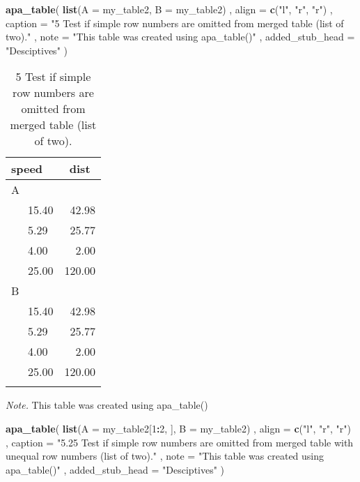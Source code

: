 \documentclass[man]{apa6}
\newenvironment{Shaded}{\begin{snugshade}}{\end{snugshade}}
\newcommand{\KeywordTok}[1]{\textcolor[rgb]{0.13,0.29,0.53}{\textbf{#1}}}
\newcommand{\DataTypeTok}[1]{\textcolor[rgb]{0.13,0.29,0.53}{#1}}
\newcommand{\DecValTok}[1]{\textcolor[rgb]{0.00,0.00,0.81}{#1}}
\newcommand{\StringTok}[1]{\textcolor[rgb]{0.31,0.60,0.02}{#1}}
\newcommand{\OperatorTok}[1]{\textcolor[rgb]{0.81,0.36,0.00}{\textbf{#1}}}
\newcommand{\NormalTok}[1]{#1}
\begin{document}
\begin{Shaded}
\begin{Highlighting}[]
\KeywordTok{apa_table}\NormalTok{(}
  \KeywordTok{list}\NormalTok{(}\DataTypeTok{A =}\NormalTok{ my_table2, }\DataTypeTok{B =}\NormalTok{ my_table2)}
\NormalTok{  , }\DataTypeTok{align =} \KeywordTok{c}\NormalTok{(}\StringTok{"l"}\NormalTok{, }\StringTok{"r"}\NormalTok{, }\StringTok{"r"}\NormalTok{)}
\NormalTok{  , }\DataTypeTok{caption =} \StringTok{"5 Test if simple row numbers are omitted from merged table (list of two)."}
\NormalTok{  , }\DataTypeTok{note =} \StringTok{"This table was created using apa_table()"}
\NormalTok{  , }\DataTypeTok{added_stub_head =} \StringTok{"Desciptives"}
\NormalTok{)}
\end{Highlighting}
\end{Shaded}

\begin{table}[tbp]
\begin{center}
\begin{threeparttable}
\caption{\label{tab:unnamed-chunk-5}5 Test if simple row numbers are omitted from merged table (list of two).}
\begin{tabular}{lr}
\toprule
speed & \multicolumn{1}{c}{dist}\\
\midrule
A & \\
\ \ \ 15.40 & 42.98\\
\ \ \ 5.29 & 25.77\\
\ \ \ 4.00 & 2.00\\
\ \ \ 25.00 & 120.00\\
B & \\
\ \ \ 15.40 & 42.98\\
\ \ \ 5.29 & 25.77\\
\ \ \ 4.00 & 2.00\\
\ \ \ 25.00 & 120.00\\
\bottomrule
\addlinespace
\end{tabular}
\begin{tablenotes}[para]
\normalsize{\textit{Note.} This table was created using apa\_table()}
\end{tablenotes}
\end{threeparttable}
\end{center}
\end{table}

\begin{Shaded}
\begin{Highlighting}[]
\KeywordTok{apa_table}\NormalTok{(}
  \KeywordTok{list}\NormalTok{(}\DataTypeTok{A =}\NormalTok{ my_table2[}\DecValTok{1}\OperatorTok{:}\DecValTok{2}\NormalTok{, ], }\DataTypeTok{B =}\NormalTok{ my_table2)}
\NormalTok{  , }\DataTypeTok{align =} \KeywordTok{c}\NormalTok{(}\StringTok{"l"}\NormalTok{, }\StringTok{"r"}\NormalTok{, }\StringTok{"r"}\NormalTok{)}
\NormalTok{  , }\DataTypeTok{caption =} \StringTok{"5.25 Test if simple row numbers are omitted from merged table with unequal row numbers (list of two)."}
\NormalTok{  , }\DataTypeTok{note =} \StringTok{"This table was created using apa_table()"}
\NormalTok{  , }\DataTypeTok{added_stub_head =} \StringTok{"Desciptives"}
\NormalTok{)}
\end{Highlighting}
\end{Shaded}
\end{document}
